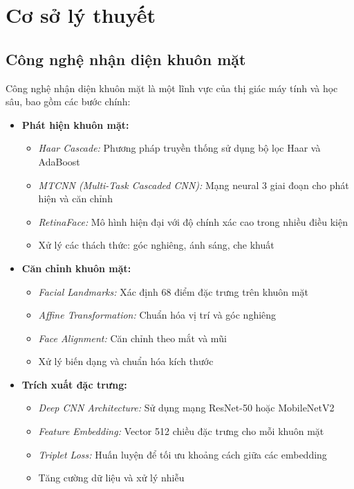\section{Cơ sở lý thuyết}

\subsection{Công nghệ nhận diện khuôn mặt}
\hspace{0.5cm}Công nghệ nhận diện khuôn mặt là một lĩnh vực của thị giác máy tính và học sâu, bao gồm các bước chính:

\begin{itemize}
    \item \textbf{Phát hiện khuôn mặt:}
    \begin{itemize}
        \item \textit{Haar Cascade:} Phương pháp truyền thống sử dụng bộ lọc Haar và AdaBoost
        \item \textit{MTCNN (Multi-Task Cascaded CNN):} Mạng neural 3 giai đoạn cho phát hiện và căn chỉnh
        \item \textit{RetinaFace:} Mô hình hiện đại với độ chính xác cao trong nhiều điều kiện
        \item Xử lý các thách thức: góc nghiêng, ánh sáng, che khuất
    \end{itemize}
    
    \item \textbf{Căn chỉnh khuôn mặt:}
    \begin{itemize}
        \item \textit{Facial Landmarks:} Xác định 68 điểm đặc trưng trên khuôn mặt
        \item \textit{Affine Transformation:} Chuẩn hóa vị trí và góc nghiêng
        \item \textit{Face Alignment:} Căn chỉnh theo mắt và mũi
        \item Xử lý biến dạng và chuẩn hóa kích thước
    \end{itemize}
    
    \item \textbf{Trích xuất đặc trưng:}
    \begin{itemize}
        \item \textit{Deep CNN Architecture:} Sử dụng mạng ResNet-50 hoặc MobileNetV2
        \item \textit{Feature Embedding:} Vector 512 chiều đặc trưng cho mỗi khuôn mặt
        \item \textit{Triplet Loss:} Huấn luyện để tối ưu khoảng cách giữa các embedding
        \item Tăng cường dữ liệu và xử lý nhiễu
    \end{itemize}
    

\end{itemize}
